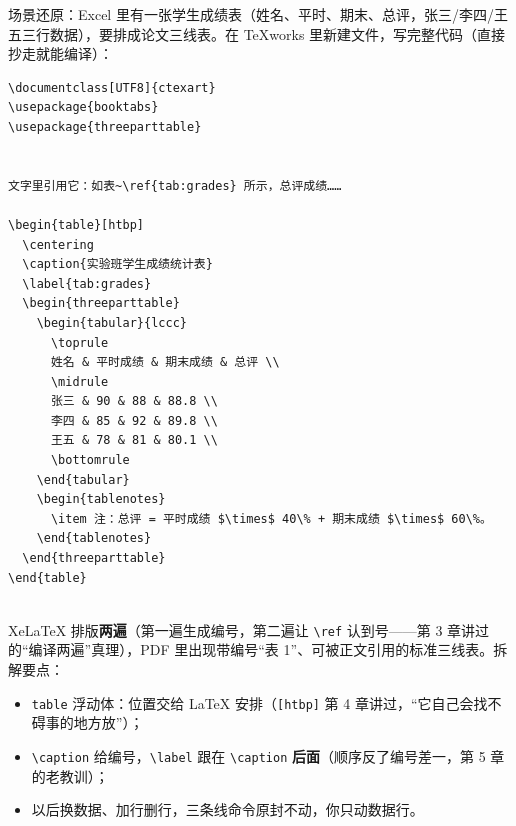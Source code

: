 场景还原：Excel 里有一张学生成绩表（姓名、平时、期末、总评，张三/李四/王五三行数据），要排成论文三线表。在 TeXworks 里新建文件，写完整代码（直接抄走就能编译）：

\begin{lstlisting}
\documentclass[UTF8]{ctexart}
\usepackage{booktabs}
\usepackage{threeparttable}


文字里引用它：如表~\ref{tab:grades} 所示，总评成绩……

\begin{table}[htbp]
  \centering
  \caption{实验班学生成绩统计表}
  \label{tab:grades}
  \begin{threeparttable}
    \begin{tabular}{lccc}
      \toprule
      姓名 & 平时成绩 & 期末成绩 & 总评 \\
      \midrule
      张三 & 90 & 88 & 88.8 \\
      李四 & 85 & 92 & 89.8 \\
      王五 & 78 & 81 & 80.1 \\
      \bottomrule
    \end{tabular}
    \begin{tablenotes}
      \item 注：总评 = 平时成绩 $\times$ 40\% + 期末成绩 $\times$ 60\%。
    \end{tablenotes}
  \end{threeparttable}
\end{table}


\end{lstlisting}

XeLaTeX 排版\textbf{两遍}（第一遍生成编号，第二遍让 \texttt{\textbackslash{}ref} 认到号——第 3 章讲过的“编译两遍”真理），PDF 里出现带编号“表 1”、可被正文引用的标准三线表。拆解要点：

\begin{itemize}
\setlength{\itemsep}{2pt}
\item \texttt{table} 浮动体：位置交给 LaTeX 安排（\texttt{[htbp]} 第 4 章讲过，“它自己会找不碍事的地方放”）；
\item \texttt{\textbackslash{}caption} 给编号，\texttt{\textbackslash{}label} 跟在 \texttt{\textbackslash{}caption} \textbf{后面}（顺序反了编号差一，第 5 章的老教训）；
\item 以后换数据、加行删行，三条线命令原封不动，你只动数据行。
\end{itemize}


